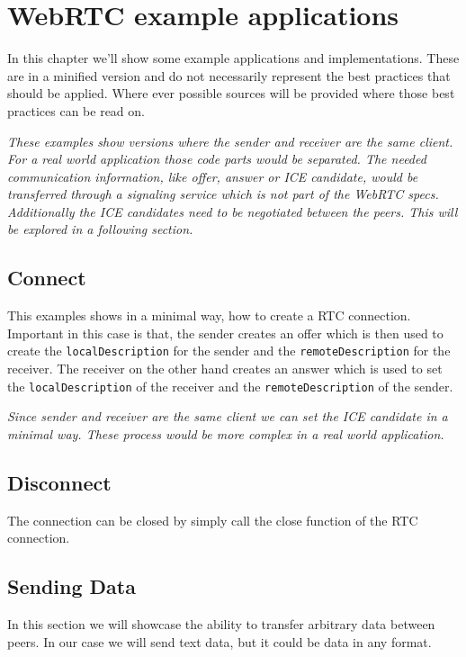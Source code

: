 \clearpage
\chapter{WebRTC example applications}
In this chapter we'll show some example applications and implementations. These are in a minified version and do not necessarily represent the best practices that should be applied. Where ever possible sources will be provided where those best practices can be read on.

\textit{These examples show versions where the sender and receiver are the same client. For a real world application those code parts would be separated. The needed communication information, like offer, answer or ICE candidate, would be transferred through a signaling service which is not part of the WebRTC specs. Additionally the ICE candidates need to be negotiated between the peers. This will be explored in a following section.}

\section{Connect}
This examples shows in a minimal way, how to create a RTC connection. Important in this case is that, the sender creates an offer which is then used to create the \lstinline[basicstyle=\ttfamily\color{black}]|localDescription| for the sender and the \lstinline[basicstyle=\ttfamily\color{black}]|remoteDescription| for the receiver. The receiver on the other hand creates an answer which is used to set the \lstinline[basicstyle=\ttfamily\color{black}]|localDescription| of the receiver and the \lstinline[basicstyle=\ttfamily\color{black}]|remoteDescription| of the sender.

\textit{Since sender and receiver are the same client we can set the ICE candidate in a minimal way. These process would be more complex in a real world application.}


\section{Disconnect}
The connection can be closed by simply call the close function of the RTC connection.


\section{Sending Data}
In this section we will showcase the ability to transfer arbitrary data between peers. In our case we will send text data, but it could be data in any format.

